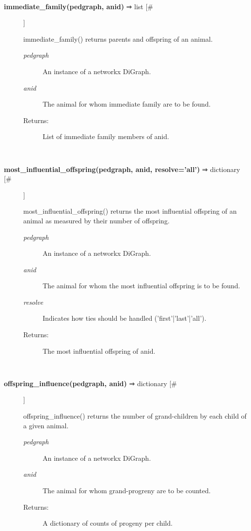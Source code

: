\begin{description}
\begin{description}
\end{description}
\\ 

\item[\textbf{immediate\_family(pedgraph, anid)}
 ⇒ list [\#]]

 immediate\_family() returns parents and offspring of an animal.
\begin{description}
\item[\emph{pedgraph}
] An instance of a networkx DiGraph.
\item[\emph{anid}
] The animal for whom immediate family are to be found.
\item[Returns:] List of immediate family members of anid.

\end{description}
\\ 

\item[\textbf{most\_influential\_offspring(pedgraph, anid, resolve='all')}
 ⇒ dictionary [\#]]

 most\_influential\_offspring() returns the most influential offspring of an animal as measured by their number of offspring.
\begin{description}
\item[\emph{pedgraph}
] An instance of a networkx DiGraph.
\item[\emph{anid}
] The animal for whom the most influential offspring is to be found.
\item[\emph{resolve}
] Indicates how ties should be handled ('first'|'last'|'all').
\item[Returns:] The most influential offspring of anid.

\end{description}
\\ 

\item[\textbf{offspring\_influence(pedgraph, anid)}
 ⇒ dictionary [\#]]

 offspring\_influence() returns the number of grand-children by each child of a given animal.
\begin{description}
\item[\emph{pedgraph}
] An instance of a networkx DiGraph.
\item[\emph{anid}
] The animal for whom grand-progreny are to be counted.
\item[Returns:] A dictionary of counts of progeny per child.

\end{description}
\\ 


\end{description}
